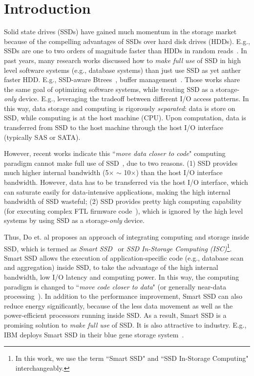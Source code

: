 
\section{Introduction}
Solid state drives (SSDs) have gained much momentum in the storage market because of the compelling advantages of SSDs over hard disk drives (HDDs). E.g., SSDs are one to two orders of magnitude faster than HDDs in random reads~\cite{AthanassoulisACGS10}. In past years, many research works discussed how to \emph{make full use} of SSD in high level software systems (e.g., database systems) than just use SSD as yet anther faster HDD.
E.g., SSD-aware Btrees~\cite{Li2010TIS}, buffer management~\cite{Do2011TDB}. Those works share the same goal of optimizing software systems, while treating SSD as a storage-\emph{only} device. E.g., leveraging the tradeoff between different I/O access patterns. In this way, data storage and computing is rigorously \emph{separated}: data is store on SSD, while computing is at the host machine (CPU). Upon computation, data is transferred from SSD to the host machine through the host I/O interface (typically SAS or SATA).

However, recent works indicate this ``\emph{move data closer to code}" computing paradigm cannot make full use of SSD~\cite{Do2013QPS,WoodsIA14}, due to two reasons. (1) SSD provides much higher internal bandwidth (5$\times$ $\sim$ 10$\times$) than the host I/O interface bandwidth. However, data has to be transferred via the host I/O interface, which can saturate easily for data-intensive applications, making the high internal bandwidth of SSD wasteful; (2) SSD provides pretty high computing capability (for executing complex FTL firmware code~\cite{Chung2009SFT}), which is ignored by the high level systems by using SSD as a storage-\emph{only} device.

Thus, Do et. al proposes an approach of integrating computing and storage inside SSD, which is termed as \emph{Smart SSD}~\cite{Do2013QPS} or \emph{SSD In-Storage Computing (ISC)}\footnote{In this work, we use the term ``Smart SSD" and ``SSD In-Storage Computing" interchangeably.}. Smart SSD allows the execution of application-specific code (e.g., database scan and aggregation) inside SSD, to take the advantage of the high internal bandwidth, low I/O latency and computing power. In this way, the computing paradigm is changed to ``\emph{move code closer to data}" (or generally near-data processing~\cite{Balasubramonian14}). In addition to the performance improvement, Smart SSD can also reduce energy significantly, because of the less data movement as well as the power-efficient processors running inside SSD. As a result, Smart SSD is a promising solution to \emph{make full use} of SSD. It is also attractive to industry. E.g., IBM deploys Smart SSD in their blue gene storage system~\cite{Julich13}.

